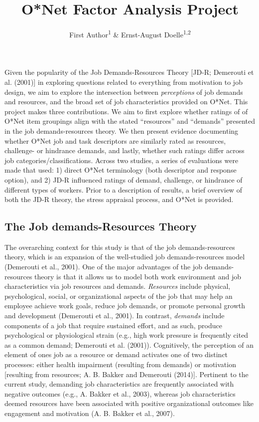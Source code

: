\documentclass[
  man]{apa6}
\title{O*Net Factor Analysis Project}
\author{First Author\textsuperscript{1} \& Ernst-August Doelle\textsuperscript{1,2}}
\date{}
\affiliation{\vspace{0.5cm}\textsuperscript{1} Wilhelm-Wundt-University\\\textsuperscript{2} Konstanz Business School}
\begin{document}
\maketitle

Given the popularity of the Job Demands-Resources Theory {[}JD-R; Demerouti et al. (2001){]} in exploring questions related to everything from motivation to job design, we aim to explore the intersection between \emph{perceptions} of job demands and resources, and the broad set of job characteristics provided on O*Net. This project makes three contributions. We aim to first explore whether ratings of of O*Net item groupings align with the stated ``resources'' and ``demands'' presented in the job demands-resources theory. We then present evidence documenting whether O*Net job and task descriptors are similarly rated as resources, challenge- or hindrance demands, and lastly, whether such ratings differ across job categories/classifications.
Across two studies, a series of evaluations were made that used: 1) direct O*Net terminology (both descriptor and response option), and 2) JD-R influenced ratings of demand, challenge, or hindrance of different types of workers. Prior to a description of results, a brief overview of both the JD-R theory, the stress appraisal process, and O*Net is provided.

\hypertarget{the-job-demands-resources-theory}{%
\subsection{The Job demands-Resources Theory}\label{the-job-demands-resources-theory}}

The overarching context for this study is that of the job demands-resources theory, which is an expansion of the well-studied job demands-resources model (Demerouti et al., 2001). One of the major advantages of the job demands-resources theory is that it allows us to model both work environment and job characteristics via job resources and demands. \emph{Resources} include physical, psychological, social, or organizational aspects of the job that may help an employee achieve work goals, reduce job demands, or promote personal growth and development (Demerouti et al., 2001). In contrast, \emph{demands} include components of a job that require sustained effort, and as such, produce psychological or physiological strain (e.g., high work pressure is frequently cited as a common demand; Demerouti et al. (2001)).
Cognitively, the perception of an element of ones job as a resource or demand activates one of two distinct processes: either health impairment (resulting from demands) or motivation {[}resulting from resources; A. B. Bakker and Demerouti (2014){]}. Pertinent to the current study, demanding job characteristics are frequently associated with negative outcomes (e.g., A. Bakker et al., 2003), whereas job characteristics deemed resources have been associated with positive organizational outcomes like engagement and motivation (A. B. Bakker et al., 2007).
\end{document}
